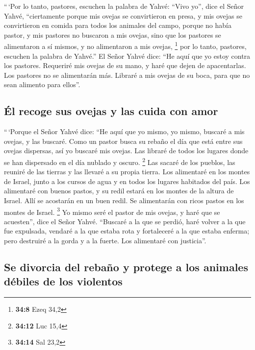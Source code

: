 ``\,`Por lo tanto, pastores, escuchen la palabra de
Yahvé:  ``Vivo yo'', dice el Señor Yahvé, ``ciertamente
porque mis ovejas se convirtieron en presa, y mis ovejas se convirtieron
en comida para todos los animales del campo, porque no había pastor, y
mis pastores no buscaron a mis ovejas, sino que los pastores se
alimentaron a sí mismos, y no alimentaron a mis ovejas, \footnote{\textbf{34:8}
  Ezeq 34,2}  por lo tanto, pastores, escuchen la palabra
de Yahvé.''  El Señor Yahvé dice: ``He aquí que yo estoy
contra los pastores. Requeriré mis ovejas de su mano, y haré que dejen
de apacentarlas. Los pastores no se alimentarán más. Libraré a mis
ovejas de su boca, para que no sean alimento para ellos''.

\hypertarget{uxe9l-recoge-sus-ovejas-y-las-cuida-con-amor}{%
\subsection{Él recoge sus ovejas y las cuida con
amor}\label{uxe9l-recoge-sus-ovejas-y-las-cuida-con-amor}}

 ``\,`Porque el Señor Yahvé dice: ``He aquí que yo mismo,
yo mismo, buscaré a mis ovejas, y las buscaré.  Como un
pastor busca su rebaño el día que está entre sus ovejas dispersas, así
yo buscaré mis ovejas. Las libraré de todos los lugares donde se han
dispersado en el día nublado y oscuro. \footnote{\textbf{34:12} Luc 15,4}
 Las sacaré de los pueblos, las reuniré de las tierras y
las llevaré a su propia tierra. Los alimentaré en los montes de Israel,
junto a los cursos de agua y en todos los lugares habitados del país.
 Los alimentaré con buenos pastos, y su redil estará en
los montes de la altura de Israel. Allí se acostarán en un buen redil.
Se alimentarán con ricos pastos en los montes de Israel. \footnote{\textbf{34:14}
  Sal 23,2}  Yo mismo seré el pastor de mis ovejas, y
haré que se acuesten'', dice el Señor Yahvé.  ``Buscaré a
la que se perdió, haré volver a la que fue expulsada, vendaré a la que
estaba rota y fortaleceré a la que estaba enferma; pero destruiré a la
gorda y a la fuerte. Los alimentaré con justicia''.

\hypertarget{se-divorcia-del-rebauxf1o-y-protege-a-los-animales-duxe9biles-de-los-violentos}{%
\subsection{Se divorcia del rebaño y protege a los animales débiles de
los
violentos}\label{se-divorcia-del-rebauxf1o-y-protege-a-los-animales-duxe9biles-de-los-violentos}}

